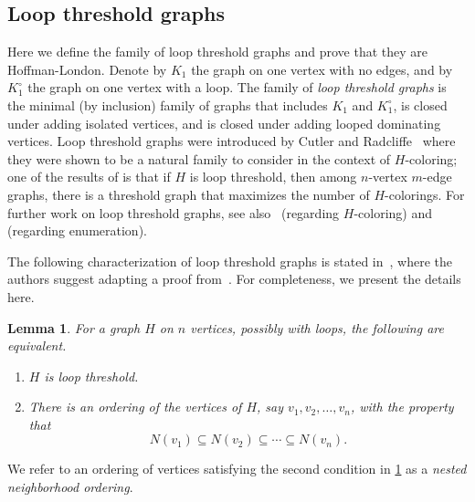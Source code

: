 \documentclass[11pt]{article}
\newtheorem{lemma}[theorem]{Lemma}
\theoremstyle{definition}
\renewcommand{\loop}{\circ}
\begin{document}
\subsection{Loop threshold graphs} \label{sec:loop-thresh}

Here we define the family of loop threshold graphs and prove that they are Hoffman-London. Denote by $K_1$ the graph on one vertex with no edges, and by $K^{\loop}_1$ the graph on one vertex with a loop. The family of \emph{loop threshold graphs} is the minimal (by inclusion) family of graphs that includes $K_1$ and $K^{\loop}_1$, is closed under adding isolated vertices, and is closed under adding looped dominating vertices. Loop threshold graphs were introduced by Cutler and Radcliffe~\cite{CutlerRadcliffe2014} where they were shown to be a natural family to consider in the context of $H$-coloring; one of the results of \cite{CutlerRadcliffe2014} is that if $H$ is loop threshold, then among $n$-vertex $m$-edge graphs, there is a threshold graph that maximizes the number of $H$-colorings. For further work on loop threshold graphs, see also~\cite{CutlerKass2020} (regarding $H$-coloring) and~\cite{GalvinWesleyZacovic2022} (regarding enumeration). 

The following characterization of loop threshold graphs is stated in~\cite{CutlerRadcliffe2014}, where the authors suggest adapting a proof from~\cite{ChvatalHammer1977}. For completeness, we present the details here.

\begin{lemma} \label{lem:loop_thresh_char}
For a graph $H$ on $n$ vertices, possibly with loops, the following are equivalent.
\begin{enumerate}
\item $H$ is loop threshold.
\item There is an ordering of the vertices of $H$, say $v_1, v_2, \ldots, v_n$, with the property that
\[N(v_1) \subseteq N(v_2) \subseteq \cdots \subseteq N(v_n).\]
\end{enumerate}
\end{lemma}
We refer to an ordering of vertices satisfying the second condition in \cref{lem:loop_thresh_char} as a \emph{nested neighborhood ordering}.
 
\end{document}
